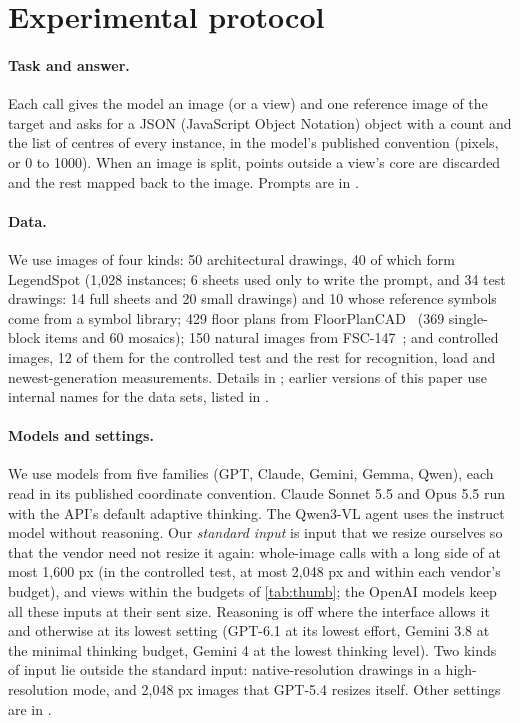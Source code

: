 \section{Experimental protocol}
\label{sec:protocol}

\paragraph{Task and answer.} Each call gives the model an image (or a view) and one reference image of the target and asks for a JSON (JavaScript Object Notation) object with a count and the list of centres of every instance, in the model's published convention (pixels, or 0 to 1000). When an image is split, points outside a view's core are discarded and the rest mapped back to the image. Prompts are in .

\paragraph{Data.} We use \CscaleImages{} images of four kinds: 50 architectural drawings, 40 of which form LegendSpot (1{,}028 instances; 6 sheets used only to write the prompt, and 34 test drawings: 14 full sheets and 20 small drawings) and 10 whose reference symbols come from a symbol library; 429 floor plans from FloorPlanCAD~\cite{fan2021floorplancad} (369 single-block items and 60 mosaics); 150 natural images from FSC-147~\cite{ranjan2021fsc147}; and \CscaleCtrl{} controlled images, 12 of them for the controlled test and the rest for recognition, load and newest-generation measurements. Details in ; earlier versions of this paper use internal names for the data sets, listed in .

\paragraph{Models and settings.} We use \CscaleModels{} models from five families (GPT, Claude, Gemini, Gemma, Qwen), each read in its published coordinate convention. Claude Sonnet 5.5 and Opus 5.5 run with the API's default adaptive thinking. The Qwen3-VL agent uses the instruct model without reasoning. Our \emph{standard input} is input that we resize ourselves so that the vendor need not resize it again: whole-image calls with a long side of at most 1{,}600 px (in the controlled test, at most 2{,}048 px and within each vendor's budget), and views within the budgets of \cref{tab:thumb}; the OpenAI models keep all these inputs at their sent size. Reasoning is off where the interface allows it and otherwise at its lowest setting (GPT-6.1 at its lowest effort, Gemini 3.8 at the minimal thinking budget, Gemini 4 at the lowest thinking level). Two kinds of input lie outside the standard input: native-resolution drawings in a high-resolution mode, and 2{,}048 px images that GPT-5.4 resizes itself. Other settings are in .

